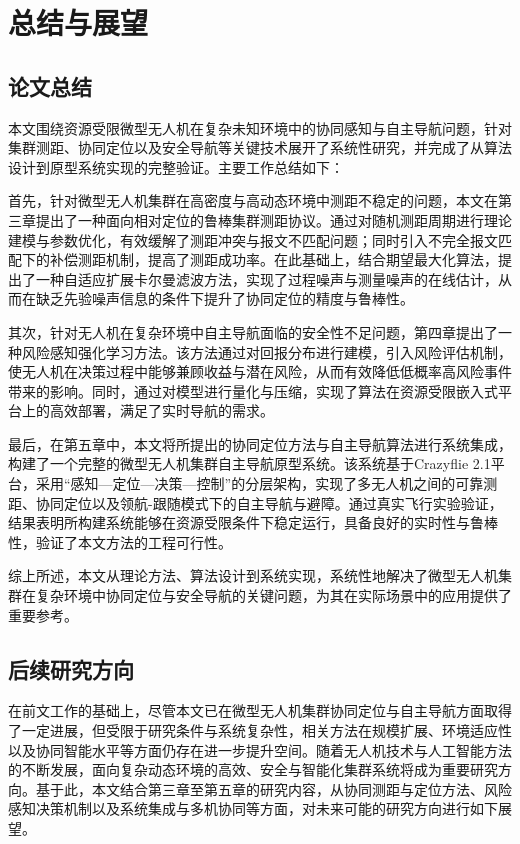 \chapter{总结与展望}


\section{论文总结}
本文围绕资源受限微型无人机在复杂未知环境中的协同感知与自主导航问题，针对集群测距、协同定位以及安全导航等关键技术展开了系统性研究，并完成了从算法设计到原型系统实现的完整验证。主要工作总结如下：

首先，针对微型无人机集群在高密度与高动态环境中测距不稳定的问题，本文在第三章提出了一种面向相对定位的鲁棒集群测距协议。通过对随机测距周期进行理论建模与参数优化，有效缓解了测距冲突与报文不匹配问题；同时引入不完全报文匹配下的补偿测距机制，提高了测距成功率。在此基础上，结合期望最大化算法，提出了一种自适应扩展卡尔曼滤波方法，实现了过程噪声与测量噪声的在线估计，从而在缺乏先验噪声信息的条件下提升了协同定位的精度与鲁棒性。

其次，针对无人机在复杂环境中自主导航面临的安全性不足问题，第四章提出了一种风险感知强化学习方法。该方法通过对回报分布进行建模，引入风险评估机制，使无人机在决策过程中能够兼顾收益与潜在风险，从而有效降低低概率高风险事件带来的影响。同时，通过对模型进行量化与压缩，实现了算法在资源受限嵌入式平台上的高效部署，满足了实时导航的需求。

最后，在第五章中，本文将所提出的协同定位方法与自主导航算法进行系统集成，构建了一个完整的微型无人机集群自主导航原型系统。该系统基于Crazyflie 2.1平台，采用“感知—定位—决策—控制”的分层架构，实现了多无人机之间的可靠测距、协同定位以及领航-跟随模式下的自主导航与避障。通过真实飞行实验验证，结果表明所构建系统能够在资源受限条件下稳定运行，具备良好的实时性与鲁棒性，验证了本文方法的工程可行性。

综上所述，本文从理论方法、算法设计到系统实现，系统性地解决了微型无人机集群在复杂环境中协同定位与安全导航的关键问题，为其在实际场景中的应用提供了重要参考。

\section{后续研究方向}
在前文工作的基础上，尽管本文已在微型无人机集群协同定位与自主导航方面取得了一定进展，但受限于研究条件与系统复杂性，相关方法在规模扩展、环境适应性以及协同智能水平等方面仍存在进一步提升空间。随着无人机技术与人工智能方法的不断发展，面向复杂动态环境的高效、安全与智能化集群系统将成为重要研究方向。基于此，本文结合第三章至第五章的研究内容，从协同测距与定位方法、风险感知决策机制以及系统集成与多机协同等方面，对未来可能的研究方向进行如下展望。
